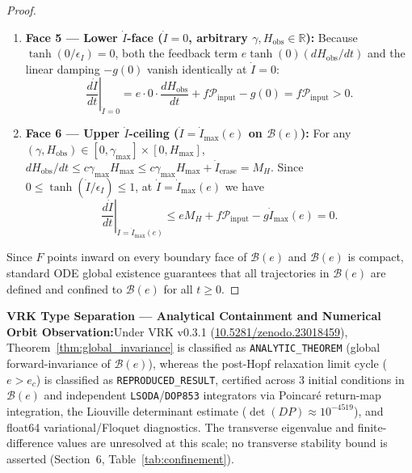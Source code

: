 \documentclass[11pt,a4paper]{article}
\theoremstyle{remark}
\newcommand{\takeaway}[2]{%
  \vspace{2pt}\noindent\colorbox{primary!7}{%
    \parbox{\dimexpr\textwidth-2\fboxsep\relax}{%
      \vspace{2pt}\textbf{\color{primary}#1:}\hspace{0.5em}#2\vspace{2pt}%
    }%
  }\vspace{2pt}%
}
\begin{document}
\begin{proof}
\begin{enumerate}
\begin{equation}
    \end{equation}
    \item \textbf{Face 5 --- Lower $\dot{I}$-face ($\dot{I} = 0$, arbitrary $\gamma, H_{\text{obs}} \in \mathbb{R}$):} Because $\tanh(0/\epsilon_I) = 0$, both the feedback term $e\tanh(0)(dH_{\text{obs}}/dt)$ and the linear damping $-g(0)$ vanish identically at $\dot{I} = 0$:
    \begin{equation}
    \left.\frac{d\dot{I}}{dt}\right|_{\dot{I}=0} = e\cdot 0\cdot \frac{dH_{\text{obs}}}{dt} + f\mathcal{P}_{\text{input}} - g(0) = f\mathcal{P}_{\text{input}} > 0.
    \end{equation}
    \item \textbf{Face 6 --- Upper $\dot{I}$-ceiling ($\dot{I} = \dot{I}_{\max}(e)$ on $\mathcal{B}(e)$):} For any $(\gamma, H_{\text{obs}}) \in [0,\gamma_{\max}]\times[0,H_{\max}]$, $dH_{\text{obs}}/dt \le c\gamma_{\max}H_{\max} \le c\gamma_{\max}H_{\max} + \dot{I}_{\text{erase}} = M_H$. Since $0 \le \tanh(\dot{I}/\epsilon_I) \le 1$, at $\dot{I} = \dot{I}_{\max}(e)$ we have
    \begin{equation}
    \left.\frac{d\dot{I}}{dt}\right|_{\dot{I}=\dot{I}_{\max}(e)} \le e M_H + f\mathcal{P}_{\text{input}} - g\dot{I}_{\max}(e) = 0.
    \end{equation}
\end{enumerate}
Since $F$ points inward on every boundary face of $\mathcal{B}(e)$ and $\mathcal{B}(e)$ is compact, standard ODE global existence guarantees that all trajectories in $\mathcal{B}(e)$ are defined and confined to $\mathcal{B}(e)$ for all $t \ge 0$.
\end{proof}

\takeaway{VRK Type Separation --- Analytical Containment and Numerical Orbit Observation}{Under VRK v0.3.1 (\href{https://doi.org/10.5281/zenodo.23018459}{10.5281/zenodo.23018459}), Theorem~\ref{thm:global_invariance} is classified as \texttt{ANALYTIC\_THEOREM} (global forward-invariance of $\mathcal{B}(e)$), whereas the post-Hopf relaxation limit cycle ($e > e_c$) is classified as \texttt{REPRODUCED\_RESULT}, certified across 3 initial conditions in $\mathcal{B}(e)$ and independent \texttt{LSODA}/\texttt{DOP853} integrators via Poincar\'e return-map integration, the Liouville determinant estimate ($\det(DP) \approx 10^{-4519}$), and float64 variational/Floquet diagnostics. The transverse eigenvalue and finite-difference values are unresolved at this scale; no transverse stability bound is asserted (Section~6, Table~\ref{tab:confinement}).}
\end{document}
